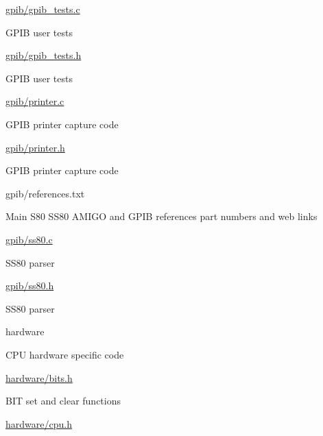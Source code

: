 \begin{DoxyItemize}
\begin{DoxyItemize}
\begin{DoxyItemize}
\end{DoxyItemize}
\item \hyperlink{gpib__tests_8c}{gpib/gpib\+\_\+tests.\+c}
\begin{DoxyItemize}
\item G\+P\+IB user tests
\end{DoxyItemize}
\item \hyperlink{gpib__tests_8h}{gpib/gpib\+\_\+tests.\+h}
\begin{DoxyItemize}
\item G\+P\+IB user tests
\end{DoxyItemize}
\item \hyperlink{printer_8c}{gpib/printer.\+c}
\begin{DoxyItemize}
\item G\+P\+IB printer capture code
\end{DoxyItemize}
\item \hyperlink{printer_8h}{gpib/printer.\+h}
\begin{DoxyItemize}
\item G\+P\+IB printer capture code
\end{DoxyItemize}
\item gpib/references.\+txt
\begin{DoxyItemize}
\item Main S80 S\+S80 A\+M\+I\+GO and G\+P\+IB references part numbers and web links
\end{DoxyItemize}
\item \hyperlink{ss80_8c}{gpib/ss80.\+c}
\begin{DoxyItemize}
\item S\+S80 parser
\end{DoxyItemize}
\item \hyperlink{ss80_8h}{gpib/ss80.\+h}
\begin{DoxyItemize}
\item S\+S80 parser
\end{DoxyItemize}
\end{DoxyItemize}
\item hardware
\begin{DoxyItemize}
\item C\+PU hardware specific code
\item \hyperlink{bits_8h}{hardware/bits.\+h}
\begin{DoxyItemize}
\item B\+IT set and clear functions
\end{DoxyItemize}
\item \hyperlink{cpu_8h}{hardware/cpu.\+h}

\end{DoxyItemize}
\end{DoxyItemize}
